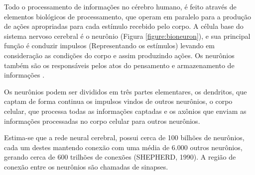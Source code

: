 
\par Todo o processamento de informações no cérebro humano, é feito através de elementos biológicos de processamento, que operam em paralelo para a produção de ações apropriadas para cada estímulo recebido pelo corpo. A célula base do sistema nervoso cerebral é o neurônio (Figura \ref{figure:bioneuron}), e sua principal função é conduzir impulsos (Representando os estímulos) levando em consideração as condições do corpo e assim produzindo ações. Os neurônios também são os responsáveis pelos atos do pensamento e armazenamento de informações \cite{livroNunes2016}.

\par Os neurônios podem ser divididos em três partes elementares, os dendritos, que captam de forma continua os impulsos vindos de outros neurônios, o corpo celular, que processa todas as informações captadas e os axônios que enviam as informações processadas no corpo celular para outros neurônios.


\par Estima-se que a rede neural cerebral, possui cerca de 100 bilhões de neurônios, cada um destes mantendo conexão com uma média de 6.000 outros neurônios, gerando cerca de 600 trilhões de conexões (SHEPHERD, 1990). A região de conexão entre os neurônios são chamadas de sinapses.



